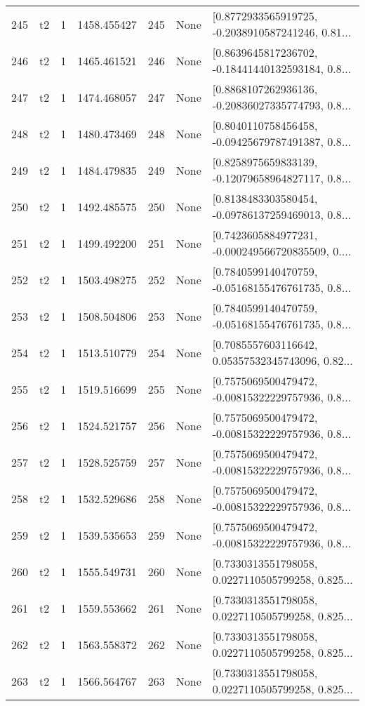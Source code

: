 \begin{tabular}{lllrlll}
245 &  t2 &   1 &  1458.455427 &  245 &  None &  [0.8772933565919725, -0.2038910587241246, 0.81... \\
246 &  t2 &   1 &  1465.461521 &  246 &  None &  [0.8639645817236702, -0.18441440132593184, 0.8... \\
247 &  t2 &   1 &  1474.468057 &  247 &  None &  [0.8868107262936136, -0.20836027335774793, 0.8... \\
248 &  t2 &   1 &  1480.473469 &  248 &  None &  [0.8040110758456458, -0.09425679787491387, 0.8... \\
249 &  t2 &   1 &  1484.479835 &  249 &  None &  [0.8258975659833139, -0.12079658964827117, 0.8... \\
250 &  t2 &   1 &  1492.485575 &  250 &  None &  [0.8138483303580454, -0.09786137259469013, 0.8... \\
251 &  t2 &   1 &  1499.492200 &  251 &  None &  [0.7423605884977231, -0.000249566720835509, 0.... \\
252 &  t2 &   1 &  1503.498275 &  252 &  None &  [0.7840599140470759, -0.05168155476761735, 0.8... \\
253 &  t2 &   1 &  1508.504806 &  253 &  None &  [0.7840599140470759, -0.05168155476761735, 0.8... \\
254 &  t2 &   1 &  1513.510779 &  254 &  None &  [0.7085557603116642, 0.05357532345743096, 0.82... \\
255 &  t2 &   1 &  1519.516699 &  255 &  None &  [0.7575069500479472, -0.00815322229757936, 0.8... \\
256 &  t2 &   1 &  1524.521757 &  256 &  None &  [0.7575069500479472, -0.00815322229757936, 0.8... \\
257 &  t2 &   1 &  1528.525759 &  257 &  None &  [0.7575069500479472, -0.00815322229757936, 0.8... \\
258 &  t2 &   1 &  1532.529686 &  258 &  None &  [0.7575069500479472, -0.00815322229757936, 0.8... \\
259 &  t2 &   1 &  1539.535653 &  259 &  None &  [0.7575069500479472, -0.00815322229757936, 0.8... \\
260 &  t2 &   1 &  1555.549731 &  260 &  None &  [0.7330313551798058, 0.0227110505799258, 0.825... \\
261 &  t2 &   1 &  1559.553662 &  261 &  None &  [0.7330313551798058, 0.0227110505799258, 0.825... \\
262 &  t2 &   1 &  1563.558372 &  262 &  None &  [0.7330313551798058, 0.0227110505799258, 0.825... \\
263 &  t2 &   1 &  1566.564767 &  263 &  None &  [0.7330313551798058, 0.0227110505799258, 0.825... \\

\end{tabular}
